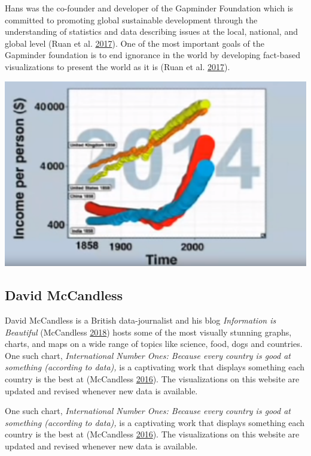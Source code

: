 \documentclass[]{book}
\begin{document}
Hans was the co-founder and developer of the Gapminder Foundation which is committed to promoting global sustainable development through the understanding of statistics and data describing issues at the local, national, and global level (Ruan et al. \protect\hyperlink{ref-gapminder}{2017}). One of the most important goals of the Gapminder foundation is to end ignorance in the world by developing fact-based visualizations to present the world as it is (Ruan et al. \protect\hyperlink{ref-gapminder}{2017}).

\includegraphics{images/hans.png}

\hypertarget{david-mccandless}{%
\subsection{David McCandless}\label{david-mccandless}}

David McCandless is a British data-journalist and his blog \emph{Information is Beautiful} (McCandless \protect\hyperlink{ref-info_beautiful}{2018}) hosts some of the most visually stunning graphs, charts, and maps on a wide range of topics like science, food, dogs and countries. One such chart, \emph{International Number Ones: Because every country is good at something (according to data),} is a captivating work that displays something each country is the best at (McCandless \protect\hyperlink{ref-country_chart}{2016}). The visualizations on this website are updated and revised whenever new data is available.

One such chart, \emph{International Number Ones: Because every country is good at something (according to data),} is a captivating work that displays something each country is the best at (McCandless \protect\hyperlink{ref-country_chart}{2016}). The visualizations on this website are updated and revised whenever new data is available.
\end{document}
